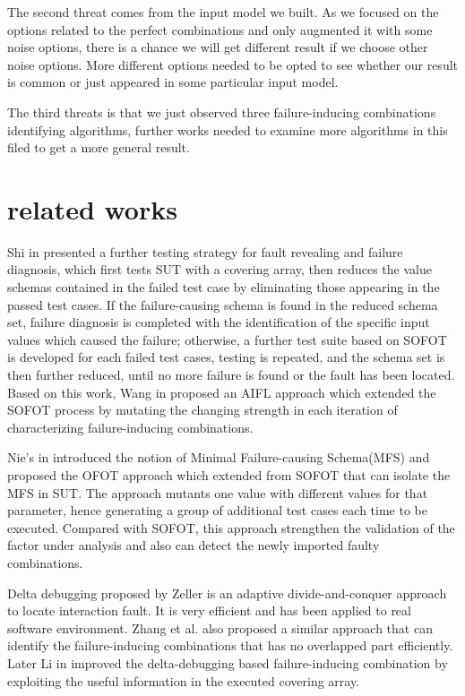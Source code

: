 \documentclass{sig-alternate}
\begin{document}
The second threat comes from the input model we built. As we focused on the options related to the perfect combinations and only augmented it with some noise options, there is a chance we will get different result if we choose other noise options. More different options needed to be opted to see whether our result is common or just appeared in some particular input model.

The third threats is that we just observed three failure-inducing combinations identifying algorithms, further works needed to examine more algorithms in this filed to get a more general result.

\section{related works}

Shi in \cite{shi2005software} presented a further testing strategy for fault revealing and failure diagnosis, which first tests SUT with a covering array, then reduces the value schemas contained in the failed test case by eliminating those appearing in the passed test cases. If the failure-causing schema is found in the reduced schema set, failure diagnosis is completed with the identiﬁcation of the speciﬁc input values which caused the failure;
otherwise, a further test suite based on SOFOT is developed for each failed test cases,
testing is repeated, and the schema set is then further reduced, until no more failure
is found or the fault has been located. Based on this work, Wang in \cite{wang2010adaptive} proposed an AIFL approach which extended the SOFOT process by mutating the changing strength in each iteration of characterizing failure-inducing combinations.

Nie's in \cite{nie2011minimal} introduced the notion of Minimal Failure-causing Schema(MFS) and proposed the OFOT approach which extended from SOFOT that can isolate the MFS in SUT. The approach mutants one value with different values for that parameter, hence generating a group of additional test cases each time to be executed. Compared with SOFOT, this approach  strengthen the validation of the factor under analysis and also can detect the newly imported faulty combinations.

Delta debugging \cite{zeller2002simplifying} proposed by Zeller is an adaptive divide-and-conquer approach to locate interaction fault. It is very efficient and has been applied to real software environment. Zhang et al. \cite{zhang2011characterizing} also proposed a similar approach that can identify the failure-inducing combinations that has no overlapped part efficiently. Later Li in \cite{li2012improved} improved the delta-debugging based failure-inducing combination by exploiting the useful information in the executed covering array.
\end{document}
